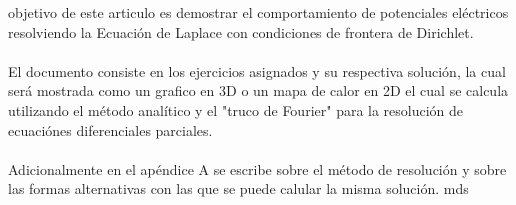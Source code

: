 \documentclass[10pt,journal,compsoc]{IEEEtran}
\begin{document}
%
\IEEEpeerreviewmaketitle







% 
% 
% 
% 
 objetivo de este articulo es demostrar el comportamiento
de potenciales eléctricos resolviendo la Ecuación de Laplace con condiciones de
frontera de Dirichlet.
\\\\
El documento consiste en los ejercicios asignados y su respectiva solución,
la cual será mostrada como un grafico en 3D o un mapa de calor en 2D el cual se
calcula utilizando el método analítico y el "truco de Fourier" para la resolución
de ecuaciónes diferenciales parciales.
\\\\
Adicionalmente en el apéndice A se escribe sobre el método de resolución y sobre 
las formas alternativas con las que se puede calular la misma solución.
\hfill mds
 
\end{document}
